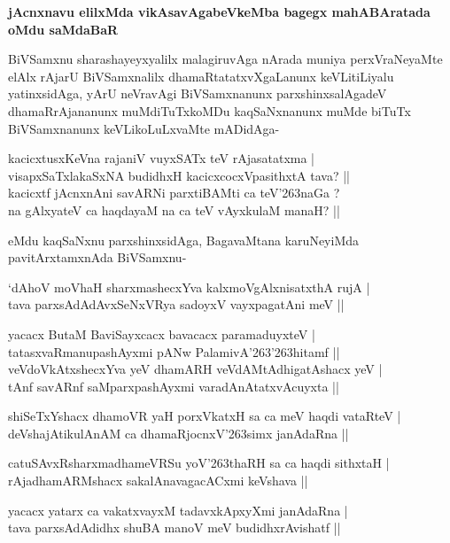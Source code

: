 \noindent
{\bf\large{jAcnxnavu elilxMda vikAsavAgabeVkeMba bagegx mahABAratada oMdu saMdaBaR}}\label{page162}

BiVSamxnu sharashayeyxyalilx malagiruvAga nArada muniya perxVraNeyaMte elAlx rAjarU BiVSamxnalilx dhamaRtatatxvXgaLanunx keVLitiLiyalu yatinxsidAga, yArU neVravAgi BiVSamxnanunx parxshinxsalAgadeV dhamaRrAjananunx muMdiTuTxkoMDu kaqSaNxnanunx muMde biTuTx BiVSamxnanunx keVLikoLuLxvaMte mADidAga-

\begin{shloka}
kacicxtusxKeVna rajaniV vuyxSATx teV rAjasatatxma |\\\label{162}
visapxSaTxlakaSxNA budidhxH kacicxcocxVpasithxtA tava? ||\\
kacicxtf jAcnxnAni savARNi parxtiBAMti ca teV\char'263naGa ?\\
na gAlxyateV ca haqdayaM na ca teV vAyxkulaM manaH? ||
\end{shloka} 

eMdu kaqSaNxnu parxshinxsidAga, BagavaMtana karuNeyiMda pavitArxtamxnAda BiVSamxnu-

\begin{shloka}
`dAhoV moVhaH sharxmashecxYva kalxmoVgAlxnisatxthA rujA |\\
tava parxsAdAdAvxSeNxVRya sadoyxV vayxpagatAni meV ||
\end{shloka}

\begin{shloka}
yacacx ButaM BaviSayxcacx bavacacx paramaduyxteV |\\
tatasxvaRmanupashAyxmi pANw PalamivA\char'263\char'263hitamf ||\\
veVdoVkAtxshecxYva yeV dhamARH veVdAMtAdhigatAshacx yeV |\\
tAnf savARnf saMparxpashAyxmi varadAnAtatxvAcuyxta ||
\end{shloka}

\begin{shloka}
shiSeTxYshacx dhamoVR yaH porxVkatxH sa ca meV haqdi vataRteV |\\
deVshajAtikulAnAM ca dhamaRjocnxV\char'263simx janAdaRna ||
\end{shloka}

\begin{shloka}
catuSAvxRsharxmadhameVRSu yoV\char'263thaRH sa ca haqdi sithxtaH |\\
rAjadhamARMshacx sakalAnavagacACxmi keVshava ||
\end{shloka}

\begin{shloka}
yacacx yatarx ca vakatxvayxM tadavxkApxyXmi janAdaRna |\\
tava parxsAdAdidhx shuBA manoV meV budidhxrAvishatf ||
\end{shloka}

